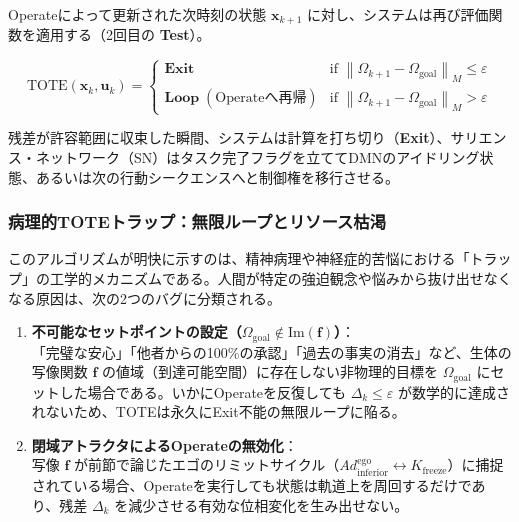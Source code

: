 Operateによって更新された次時刻の状態 $\boldsymbol{x}_{k+1}$ に対し、システムは再び評価関数を適用する（2回目の \textbf{Test}）。

\begin{equation}
    \mathrm{TOTE}(\boldsymbol{x}_k, \boldsymbol{u}_k) = 
    \begin{cases}
        \mathbf{Exit} & \text{if } \left\| \Omega_{k+1} - \Omega_{\mathrm{goal}} \right\|_M \le \varepsilon \\
        \mathbf{Loop} \; (\text{Operateへ再帰}) & \text{if } \left\| \Omega_{k+1} - \Omega_{\mathrm{goal}} \right\|_M > \varepsilon
    \end{cases}
\end{equation}

残差が許容範囲に収束した瞬間、システムは計算を打ち切り（\textbf{Exit}）、サリエンス・ネットワーク（SN）はタスク完了フラグを立ててDMNのアイドリング状態、あるいは次の行動シークエンスへと制御権を移行させる。

\subsubsection{病理的TOTEトラップ：無限ループとリソース枯渇}
このアルゴリズムが明快に示すのは、精神病理や神経症的苦悩における「トラップ」の工学的メカニズムである。人間が特定の強迫観念や悩みから抜け出せなくなる原因は、次の2つのバグに分類される。

\begin{enumerate}
    \item \textbf{不可能なセットポイントの設定（$\Omega_{\mathrm{goal}} \notin \mathrm{Im}(\boldsymbol{f})$）}：\\
    「完璧な安心」「他者からの100\%の承認」「過去の事実の消去」など、生体の写像関数 $\boldsymbol{f}$ の値域（到達可能空間）に存在しない非物理的目標を $\Omega_{\mathrm{goal}}$ にセットした場合である。いかにOperateを反復しても $\Delta_k \le \varepsilon$ が数学的に達成されないため、TOTEは永久にExit不能の無限ループに陥る。
    
    \item \textbf{閉域アトラクタによるOperateの無効化}：\\
        写像 $\boldsymbol{f}$ が前節で論じたエゴのリミットサイクル（$Ad^{\mathrm{ego}}_{\mathrm{inferior}} \leftrightarrow K_{\mathrm{freeze}}$）に捕捉されている場合、Operateを実行しても状態は軌道上を周回するだけであり、残差 $\Delta_k$ を減少させる有効な位相変化を生み出せない。
\end{enumerate}

